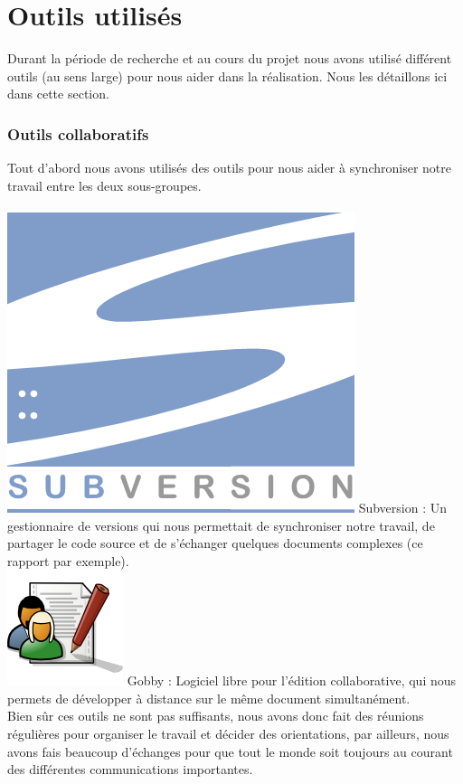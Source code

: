 \documentclass{report}
\begin{document}
		\section{Outils utilisés}
		Durant la période de recherche et au cours du projet nous avons utilisé différent outils (au sens large) pour nous aider dans la réalisation. Nous les détaillons ici dans cette section. \\
		
			\subsubsection{Outils collaboratifs}
			Tout d'abord nous avons utilisés des outils pour nous aider à synchroniser notre travail entre les deux sous-groupes. \\ \ \\
			\includegraphics[scale=1]{../logos/subversion-logo.png} 
			Subversion : Un gestionnaire de versions qui nous permettait de synchroniser notre travail, de partager le code source et de s'échanger quelques documents complexes (ce rapport par exemple).  \\
		
			\includegraphics[scale=0.25]{../logos/Gobby-logo.png} 
			Gobby :
			Logiciel libre pour l'édition collaborative, qui nous permets de développer à distance sur le même document simultanément. \\
			Bien sûr ces outils ne sont pas suffisants, nous avons donc fait des réunions régulières pour organiser le travail et décider des orientations, par ailleurs, nous avons fais beaucoup d'échanges pour que tout le monde soit toujours au courant des différentes communications importantes. \\
			
\end{document}
